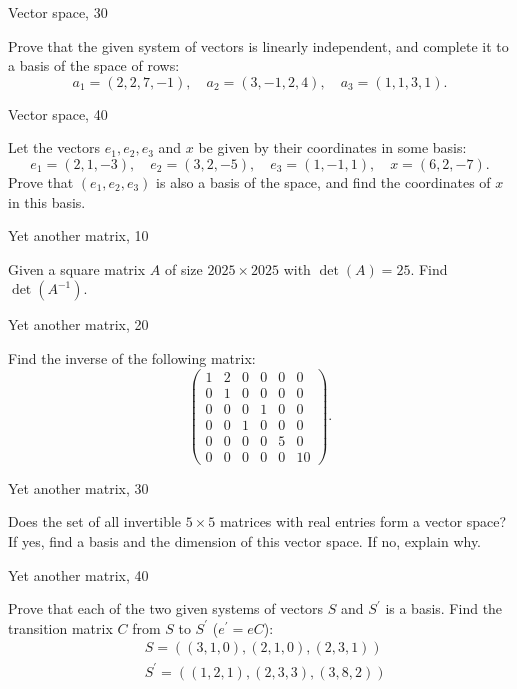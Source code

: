     
\newpage
Vector space, 30


    
    Prove that the given system of vectors is linearly independent, and complete it to a basis of the space of rows:
    $$a_1=(2,2,7,-1), \quad a_2=(3,-1,2,4), \quad a_3=(1,1,3,1).$$   
     

\newpage
Vector space, 40

    
    Let the vectors $e_1, e_2, e_3$ and $x$ be given by their coordinates in some basis:
    $$e_1=(2,1,-3), \quad e_2=(3,2,-5), \quad e_3=(1,-1,1), \quad x=(6,2,-7).$$
    Prove that $(e_1, e_2, e_3)$ is also a basis of the space, and find the coordinates of $x$ in this basis. 

    

\newpage
Yet another matrix, 10

 
    Given a square matrix $A$ of size $2025 \times 2025$ with $\det(A) = 25$. Find $\det(A^{-1})$.
   

   \newpage
Yet another matrix, 20


   
    Find the inverse of the following matrix:
$$
\begin{pmatrix}
    1 & 2 & 0 & 0 & 0 & 0 \\
    0 & 1 & 0 & 0 & 0 & 0 \\
    0 & 0 & 0 & 1 & 0 & 0 \\
    0 & 0 & 1 & 0 & 0 & 0 \\
    0 & 0 & 0 & 0 & 5 & 0 \\
    0 & 0 & 0 & 0 & 0 & 10
\end{pmatrix}.
$$
 

\newpage
Yet another matrix, 30

 
Does the set of all invertible $5 \times 5$ matrices with real entries form a vector space? If yes, find a basis and the dimension of this vector space. If no, explain why.
 

\newpage
Yet another matrix, 40

    
        Prove that each of the two given systems of vectors $S$ and $S^{\prime}$ is a basis. Find the transition matrix $C$ from $S$ to $S^{\prime}$ ($e^{\prime} = e C$):
        $$
        \begin{aligned}
        & S=((3, 1, 0),(2, 1, 0),(2, 3, 1)) \\
        & S^{\prime}=((1, 2, 1),(2, 3, 3),(3, 8, 2))
        \end{aligned}
        $$